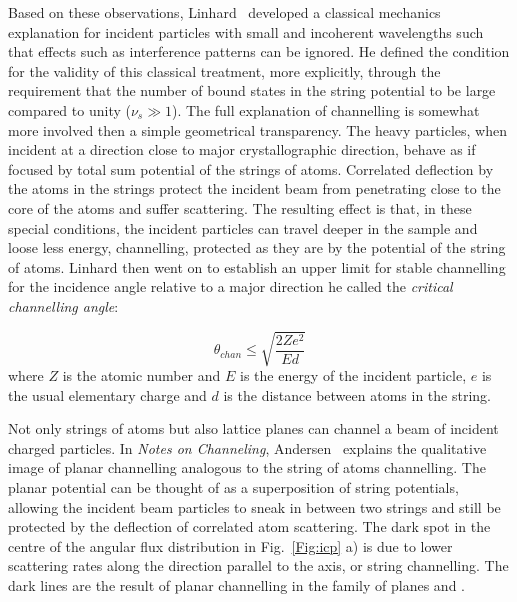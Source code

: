 Based on these observations, Linhard~\cite{Lindhard65} developed a classical mechanics explanation for incident particles with small and incoherent wavelengths such that effects such as interference patterns can be ignored. He defined the condition for the validity of this classical treatment, more explicitly, through the requirement that the number of bound states in the string potential to be large compared to unity ($\nu_s\gg1$). The full explanation of channelling is somewhat more involved then a simple geometrical transparency. The heavy particles, when incident at a direction close to major crystallographic direction, behave as if focused by total sum potential of the strings of atoms. Correlated deflection by the atoms in the strings protect the incident beam from penetrating close to the core of the atoms and suffer scattering. The resulting effect is that, in these special conditions, the incident particles can travel deeper in the sample and loose less energy, channelling, protected as they are by the potential of the string of atoms. Linhard then went on to establish an  upper limit for stable channelling for the incidence angle relative to a major direction he called the \textit{critical channelling angle}:

\begin{equation}
\theta_{chan} \leq \sqrt{\frac{2 Z e^2}{E d}} 
\end{equation} 
where $Z$ is the atomic number and $E$ is the energy of the incident particle, $e$ is the usual elementary charge and $d$ is the distance between atoms in the string.

Not only strings of atoms but also lattice planes can channel a beam of incident charged particles. In \textit{Notes on Channeling}, Andersen~\cite{Andersen14} explains the qualitative image of planar channelling analogous to the string of atoms channelling. The planar potential can be thought of as a superposition of string potentials, allowing the incident beam particles to sneak in between two strings and still be protected by the deflection of correlated atom scattering. The dark spot in the centre of the angular flux distribution in  Fig.~\ref{Fig:icp} a) is due to lower scattering rates along the direction parallel to the \hkl[001] axis, or string channelling. The dark lines are the result of planar channelling in the family of planes  and .    


